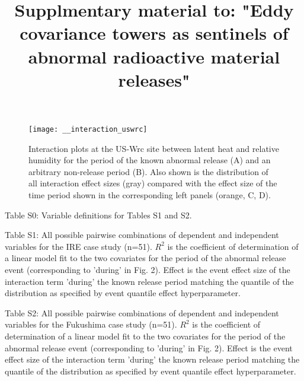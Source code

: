 \documentclass{article}
\begin{document}
\title{Supplmentary material to: "Eddy covariance towers as sentinels of abnormal radioactive material releases"}
\date{}
\maketitle


\makeatletter 
\renewcommand{\thefigure}{S\@arabic\c@figure}
\makeatother

\begin{figure}
	\centering
	\texttt{[image: \_\_interaction\_uswrc]}
	\caption{Interaction plots at the US-Wrc site between latent heat and relative humidity for the period of the known abnormal release (A) and an arbitrary non-release period (B). Also shown is the distribution of all interaction effect sizes (gray) compared with the effect size of the time period shown in the corresponding left panels (orange, C, D).}
	\label{fig:interaction_fukushima}
\end{figure}

\noindent Table S0: Variable definitions for Tables S1 and S2.


\noindent Table S1: All possible pairwise combinations of dependent and independent variables for the IRE case study (n=51). $R^2$ is the coefficient of determination of a linear model fit to the two covariates for the period of the abnormal release event (corresponding to 'during' in Fig. 2). Effect is the event effect size of the interaction term 'during' the known release period matching the quantile of the distribution as specified by event quantile effect hyperparameter.



\noindent Table S2: All possible pairwise combinations of dependent and independent variables for the Fukushima case study (n=51). $R^2$ is the coefficient of determination of a linear model fit to the two covariates for the period of the abnormal release event (corresponding to 'during' in Fig. 2). Effect is the event effect size of the interaction term 'during' the known release period matching the quantile of the distribution as specified by event quantile effect hyperparameter.


\end{document}
